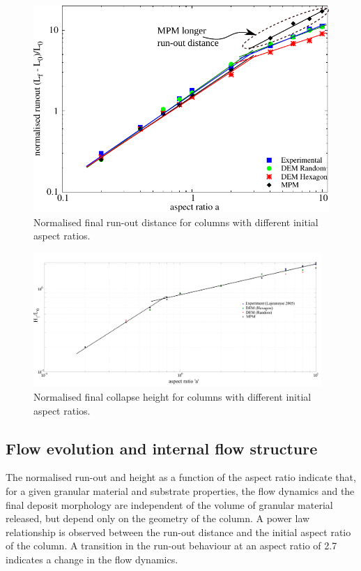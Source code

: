 \begin{figure}[tbhp]
\centering
\includegraphics[width=\textwidth]{runout}
\caption{Normalised final run-out distance for columns with different initial 
aspect ratios.}
\label{fig:run-out}
\end{figure}

\begin{figure}[tbhp]
\centering
\includegraphics[width=0.975\textwidth]{height}
\caption{Normalised final collapse height for columns with different initial 
aspect ratios.}
\label{fig:height}
\end{figure}

\subsection{Flow evolution and internal flow structure}

The normalised run-out and height as a function of the aspect ratio indicate 
that, for a given granular material and substrate properties, the flow dynamics 
and the final deposit morphology are independent of the volume of granular 
material released, but depend only on the geometry of the column. A 
power law relationship is observed between the run-out distance and the initial 
aspect ratio of the column. A transition in the run-out behaviour at an aspect 
ratio of 2.7 indicates a change in the flow dynamics. 


